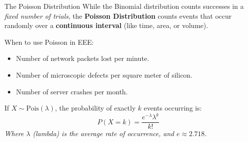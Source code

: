 \begin{frame}{The Poisson Distribution}
    While the Binomial distribution counts successes in a \textit{fixed number of trials}, the \textbf{Poisson Distribution} counts events that occur randomly over a \textbf{continuous interval} (like time, area, or volume).

    \begin{block}{When to use Poisson in EEE:}
        \begin{itemize}
            \item Number of network packets lost per minute.
            \item Number of microscopic defects per square meter of silicon.
            \item Number of server crashes per month.
        \end{itemize}
    \end{block}

    \pause 

    \begin{definition}
        If $X \sim \text{Pois}(\lambda)$, the probability of exactly $k$ events occurring is:
        \[ P(X=k) = \frac{e^{-\lambda} \lambda^k}{k!} \]
        \textit{Where $\lambda$ (lambda) is the average rate of occurrence, and $e \approx 2.718$.}
    \end{definition}
\end{frame}

